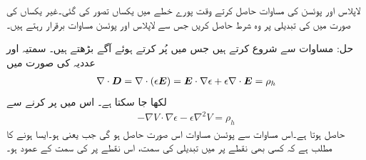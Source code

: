 لاپلاس اور پوئسن  کی مساوات حاصل کرتے وقت پورے خطے میں یکساں  تصور کی گئی۔غیر یکساں  کی صورت میں  کی تبدیلی پر وہ شرط حاصل کریں جس سے لاپلاس اور پوئسن مساوات برقرار رہتے ہیں۔

حل: مساوات  سے شروع کرتے ہیں جس میں  پُر کرتے ہوئے آگے بڑھتے ہیں۔ سمتیہ  اور عددیہ  کی صورت میں
\begin{align*}
\nabla \cdot {\ensuremath{{\boldsymbol{D}}}}=\nabla \cdot (\epsilon {\ensuremath{{\boldsymbol{E}}}})={{\boldsymbol{E}}} \cdot \nabla \epsilon+\epsilon \nabla \cdot {\ensuremath{{\boldsymbol{E}}}}=\rho_h
\end{align*}
لکھا جا سکتا ہے۔  اس میں  پر کرنے سے
\begin{align*}
-\nabla V \cdot \nabla \epsilon-\epsilon \nabla^2 V=\rho_h
\end{align*}
حاصل ہوتا ہے۔اس مساوات سے پوئسن مساوات اس صورت حاصل ہو گی جب  یعنی  ہو۔ایسا ہونے کا مطلب ہے  کہ کسی بھی نقطے پر   میں تبدیلی کی سمت، اس نقطے پر  کی  سمت کے عمود ہو۔ 


